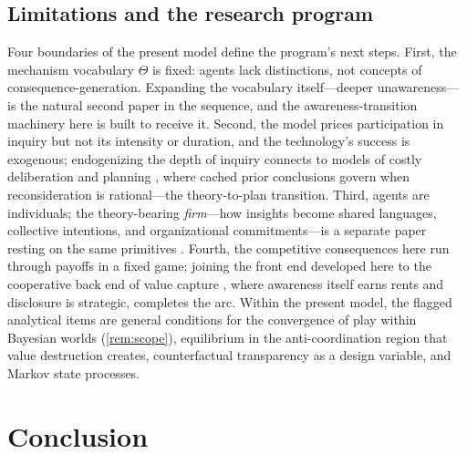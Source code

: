 \documentclass[11pt]{article}
\theoremstyle{definition}
\begin{document}
\subsection{Limitations and the research program}

Four boundaries of the present model define the program's next steps.
First, the mechanism vocabulary $\Theta$ is fixed: agents lack distinctions, not concepts of consequence-generation.
Expanding the vocabulary itself---deeper unawareness---is the natural second paper in the sequence, and the awareness-transition machinery here is built to receive it.
Second, the model prices participation in inquiry but not its intensity or duration, and the technology's success is exogenous; endogenizing the depth of inquiry connects to models of costly deliberation and planning \citep{RyallAction2026}, where cached prior conclusions govern when reconsideration is rational---the theory-to-plan transition.
Third, agents are individuals; the theory-bearing \emph{firm}---how insights become shared languages, collective intentions, and organizational commitments---is a separate paper resting on the same primitives \citep{RyallWilkins2018}.
Fourth, the competitive consequences here run through payoffs in a fixed game; joining the front end developed here to the cooperative back end of value capture \citep{GansRyall2017,BryanRyallSchipper2022}, where awareness itself earns rents and disclosure is strategic, completes the arc.
Within the present model, the flagged analytical items are general conditions for the convergence of play within Bayesian worlds (\cref{rem:scope}), equilibrium in the anti-coordination region that value destruction creates, counterfactual transparency as a design variable, and Markov state processes.

\section{Conclusion}
\label{sec:conclusion}
\end{document}
